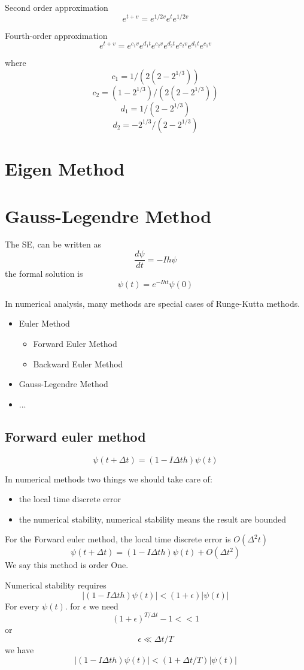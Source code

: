 \documentclass[12pt,twoside]{article}
\begin{document}
Second order approximation
$$
e^{t+v} = e^{1/2 v} e^{ t} e^{1/2 v}
$$

Fourth-order approximation
$$
e^{t+v} = e^{c_1 v} e^{d_1 t} e^{c_2 v} e^{d_2 t} e^{ c_2 v} e^{ d_1 t} e^{ c_1 v}
$$

where
$$
c_1 = 1/(2(2-2^{1/3}))
$$
$$
c_2 = (1-2^{1/3})/(2(2-2^{1/3}))
$$
$$
d_1 = 1/(2-2^{1/3})
$$
$$
d_2 = -2^{1/3}/(2-2^{1/3})
$$

\section{Eigen Method}

\section{Gauss-Legendre Method}
The SE, can be written as
$$
\frac{d\psi}{ dt} = - I h \psi
$$
the formal solution is
$$
\psi(t) = e^{ -I h t}\psi(0)
$$

In numerical analysis, many methods are special cases of Runge-Kutta methods.
\begin{itemize}
\item Euler Method
\begin{itemize}
    \item Forward Euler Method
    \item Backward Euler Method
\end{itemize}
\item Gauss-Legendre Method
\item ...
\end{itemize}

\subsection{Forward euler method}
$$
\psi(t + \Delta t) = (1 - I \Delta t h) \psi(t)
$$

In numerical methods two things we should take care of:
\begin{itemize}
\item the local time discrete error
\item the numerical stability, numerical stability means the result are bounded
\end{itemize}
For the Forward euler method, the local time discrete error is $O(\Delta ^2 t)$
$$
\psi(t + \Delta t) = (1 - I \Delta t h)\psi(t) + O(\Delta t^2)
$$
We say this method is order One.

Numerical stability requires
$$
|(1 - I \Delta t h)\psi(t)| < (1 + \epsilon)|\psi(t)|
$$
For every $\psi(t)$. for $\epsilon$ we need
$$
(1 + \epsilon)^{T/\Delta t} - 1 << 1
$$
or
$$
\epsilon \ll \Delta t / T
$$
we have
$$
|(1 - I \Delta t h)\psi(t)| < (1 + \Delta t / T)|\psi(t)|
$$
\end{document}
